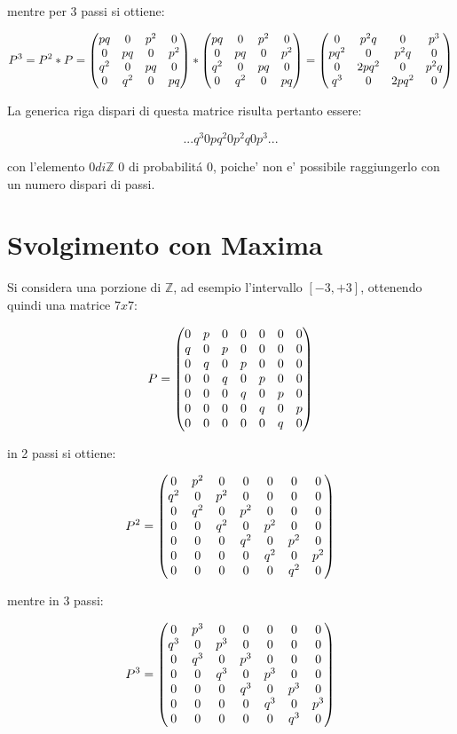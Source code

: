 \documentclass{article}
\begin{document}
mentre per 3 passi si ottiene:

$$P^3 = P^2 * P =  \begin{pmatrix}pq & 0 & p^2 & 0\cr 0 & pq & 0 & p^2\cr q^2 & 0 & pq & 0 \cr 0 & q^2 & 0 & pq \end{pmatrix} * \begin{pmatrix}pq & 0 & p^2 & 0\cr 0 & pq & 0 & p^2\cr q^2 & 0 & pq & 0 \cr 0 & q^2 & 0 & pq \end{pmatrix} =  \begin{pmatrix}0 & p^2q & 0 & p^3\cr pq^2 & 0 & p^2q & 0\cr 0 & 2pq^2 & 0 & p^2q \cr q^3 & 0 & 2pq^2 & 0\end{pmatrix}$$

La generica riga dispari di questa matrice risulta pertanto essere:

$$ ... q^3 0 pq^2 0 p^2q 0 p^3 ... $$ 

con l'elemento $0 di \mathbb{Z}$ 0 di probabilit\'{a} 0, poiche' non e' possibile raggiungerlo con un numero dispari di passi. 

\section{Svolgimento con Maxima}
Si considera una porzione di $\mathbb{Z}$, ad esempio l'intervallo $[-3, +3]$, ottenendo quindi una matrice $7x7$:

$$P = \begin{pmatrix}0 & p & 0 & 0 & 0 & 0 & 0\cr q & 0 & p & 0 & 0 & 0 & 0\cr 0 & q & 0 & p & 0 & 0 & 0\cr 0 & 0 & q & 0 & p & 0 & 0\cr 0 & 0 & 0 & q & 0 & p & 0\cr 0 & 0 & 0 & 0 & q & 0 & p\cr 0 & 0 & 0 & 0 & 0 & q & 0\end{pmatrix}$$

in 2 passi si ottiene:

$$P^2 = \begin{pmatrix}0 & {p}^{2} & 0 & 0 & 0 & 0 & 0\cr {q}^{2} & 0 & {p}^{2} & 0 & 0 & 0 & 0\cr 0 & {q}^{2} & 0 & {p}^{2} & 0 & 0 & 0\cr 0 & 0 & {q}^{2} & 0 & {p}^{2} & 0 & 0\cr 0 & 0 & 0 & {q}^{2} & 0 & {p}^{2} & 0\cr 0 & 0 & 0 & 0 & {q}^{2} & 0 & {p}^{2}\cr 0 & 0 & 0 & 0 & 0 & {q}^{2} & 0\end{pmatrix}$$

mentre in 3 passi:

$$P^3 = \begin{pmatrix}0 & {p}^{3} & 0 & 0 & 0 & 0 & 0\cr {q}^{3} & 0 & {p}^{3} & 0 & 0 & 0 & 0\cr 0 & {q}^{3} & 0 & {p}^{3} & 0 & 0 & 0\cr 0 & 0 & {q}^{3} & 0 & {p}^{3} & 0 & 0\cr 0 & 0 & 0 & {q}^{3} & 0 & {p}^{3} & 0\cr 0 & 0 & 0 & 0 & {q}^{3} & 0 & {p}^{3}\cr 0 & 0 & 0 & 0 & 0 & {q}^{3} & 0\end{pmatrix}$$
\end{document}
